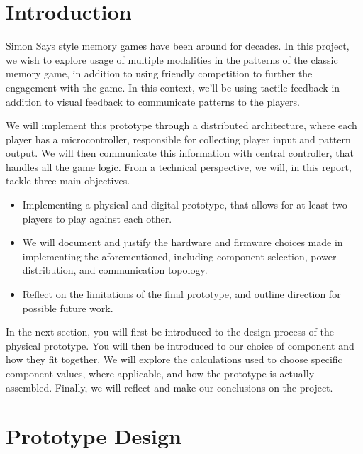 \documentclass[acmsmall]{acmart}
\begin{document}
\newpage
\section{Introduction}
Simon Says style memory games have been around for decades. In this project, we wish to explore usage of multiple modalities in the patterns 
of the classic memory game, in addition to using friendly competition to further the engagement with the game.
In this context, we'll be using tactile feedback in addition to visual feedback to communicate patterns to the players.

We will implement this prototype through a distributed architecture, where each player has a microcontroller, responsible for collecting player input
and pattern output. We will then communicate this information with central controller, that handles all the game logic.
From a technical perspective, we will, in this report, tackle three main objectives.
\begin{itemize}
	\item Implementing a physical and digital prototype, that allows for at least two players to play against each other.
	\item We will document and justify the hardware and firmware choices made in implementing the aforementioned, including component selection, power distribution, and communication topology.
	\item Reflect on the limitations of the final prototype, and outline direction for possible future work.
\end{itemize}
In the next section, you will first be introduced to the design process of the physical prototype. You will then be introduced 
to our choice of component and how they fit together. We will explore the calculations used to choose specific component values, where applicable, 
and how the prototype is actually assembled. Finally, we will reflect and make our conclusions on the project.

\section{Prototype Design}
\end{document}
